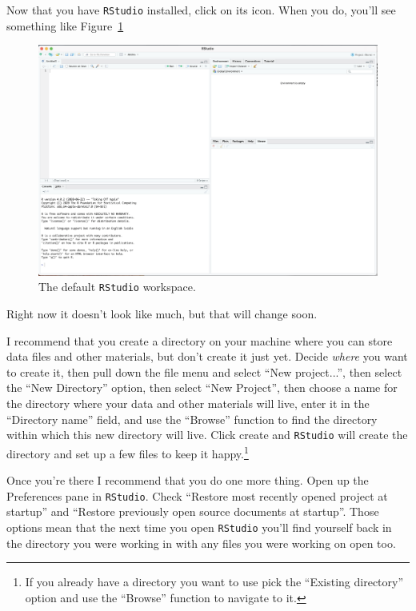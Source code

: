 \documentclass[12pt]{article}
\begin{document}
Now that you have {\tt RStudio} installed, click on its icon. When you
do, you'll see something like Figure~\ref{fig:RStudio}

\begin{figure}
  \begin{center}
    \includegraphics[width=16cm]{RStudio.eps}
  \end{center}
  \caption{The default {\tt RStudio} workspace.}\label{fig:RStudio}
\end{figure}
  
\noindent Right now it doesn't look like much, but that will change
soon.

I recommend that you create a directory on your machine where you can
store data files and other materials, but don't create it just
yet. Decide {\it where\/} you want to create it, then pull down the
file menu and select ``New project...'', then select the ``New
Directory'' option, then select ``New Project'', then choose a name
for the directory where your data and other materials will live, enter
it in the ``Directory name'' field, and use the ``Browse'' function to
find the directory within which this new directory will live. Click
create and {\tt RStudio} will create the directory and set up a few
files to keep it happy.\footnote{If you already have a directory you
  want to use pick the ``Existing directory'' option and use the
  ``Browse'' function to navigate to it.}

Once you're there I recommend that you do one more thing. Open up the
Preferences pane in {\tt RStudio}. Check ``Restore most recently
opened project at startup'' and ``Restore previously open source
documents at startup''. Those options mean that the next time you open
{\tt RStudio} you'll find yourself back in the directory you were
working in with any files you were working on open too.
\end{document}
